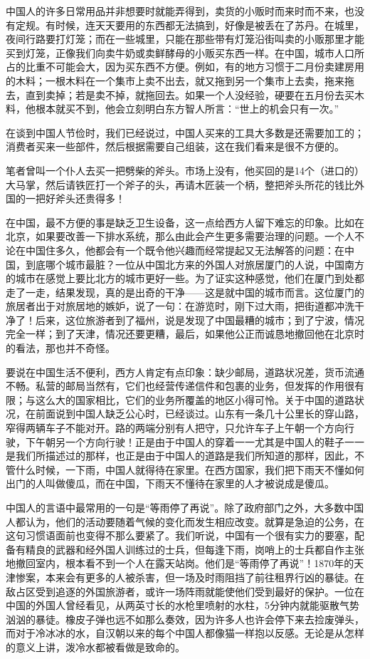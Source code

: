 \documentclass[12pt,oneside]{book}
\begin{document}
\begin{common-format}
中国人的许多日常用品并非想要时就能弄得到，卖货的小贩时而来时而不来，也没有定规。有时候，连天天要用的东西都无法搞到，好像是被丢在了苏丹。在城里，夜间行路要打灯笼；而在一些城里，只能在那些带有灯笼沿街叫卖的小贩那里才能买到灯笼，正像我们向卖牛奶或卖鲜酵母的小贩买东西一样。在中国，城市人口所占的比重不可能会大，因为买东西不方便。例如，有的地方习惯于二月份卖建房用的木料；一根木料在一个集市上卖不出去，就又拖到另一个集市上去卖，拖来拖去，直到卖掉；若是卖不掉，就拖回去。如果一个人没经验，硬要在五月份去买木料，他根本就买不到，他会立刻明白东方智人所言：“世上的机会只有一次。” 

在谈到中国人节俭时，我们已经说过，中国人买来的工具大多数是还需要加工的；消费者买来一些部件，然后根据需要自己组装，这在我们看来是很不方便的。 

笔者曾叫一个仆人去买一把劈柴的斧头。市场上没有，他买回的是14个（进口的）大马掌，然后请铁匠打一个斧子的头，再请木匠装一个柄，整把斧头所花的钱比外国的一把好斧头还贵得多！ 

在中国，最不方便的事是缺乏卫生设备，这一点给西方人留下难忘的印象。比如在北京，如果要改善一下排水系统，那么由此会产生更多需要治理的问题。一个人不论在中国住多久，他都会有一个既令他兴趣而经常提起又无法解答的问题：在中国，到底哪个城市最脏？一位从中国北方来的外国人对旅居厦门的人说，中国南方的城市在感觉上要比北方的城市更好一些。为了证实这种感觉，他们在厦门到处都走了一走，结果发现，真的是出奇的干净——这是就中国的城市而言。这位厦门的旅居者出于对旅居地的嫉妒，说了一句：在游览时，刚下过大雨，把街道都冲洗干净了！后来，这位旅游者到了福州，说是发现了中国最糟的城市；到了宁波，情况完全一样；到了天津，情况还要更糟，最后，如果他公正而诚恳地撤回他在北京时的看法，那也并不奇怪。 

要说在中国生活不便利，西方人肯定有点印象：缺少邮局，道路状况差，货币流通不畅。私营的邮局当然有，它们也经营传递信件和包裹的业务，但发挥的作用很有限；与这么大的国家相比，它们的业务所覆盖的地区小得可怜。关于中国的道路状况，在前面说到中国人缺乏公心时，已经谈过。山东有一条几十公里长的穿山路，窄得两辆车子不能对开。路的两端分别有人把守，只允许车子上午朝一个方向行驶，下午朝另一个方向行驶！正是由于中国人的穿着一一尤其是中国人的鞋子一一是我们所描述过的那样，也正是由于中国人的道路是我们所知道的那样，因此，不管什么时候，一下雨，中国人就得待在家里。在西方国家，我们把下雨天不懂如何出门的人叫做傻瓜，而在中国，下雨天不懂待在家里的人才被说成是傻瓜。 

中国人的言语中最常用的一句是“等雨停了再说”。除了政府部门之外，大多数中国人都认为，他们的活动要随着气候的变化而发生相应改变。就算是急迫的公务，在这句习惯语面前也变得不那么要紧了。我们听说，中国有一个很有实力的要塞，配备有精良的武器和经外国人训练过的士兵，但每逢下雨，岗哨上的士兵都自作主张地撤回室内，根本看不到一个人在露天站岗。他们是“等雨停了再说”！1870年的天津惨案，本来会有更多的人被杀害，但一场及时雨阻挡了前往租界行凶的暴徒。在敌占区受到追逐的外国旅游者，或许一场阵雨就能使他们受到最好的保护。一位在中国的外国人曾经看见，从两英寸长的水枪里喷射的水柱，5分钟内就能驱散气势汹汹的暴徒。橡皮子弹也远不如那么奏效，因为许多人也许会停下来去捡废弹头，而对于冷冰冰的水，自汉朝以来的每个中国人都像猫一样抱以反感。无论是从怎样的意义上讲，泼冷水都被看做是致命的。 


\end{common-format}
\end{document}
